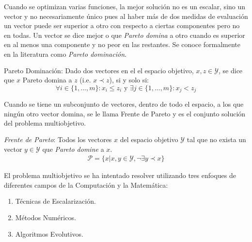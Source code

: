 Cuando se optimizan varias funciones, la mejor soluci\'on  no es un escalar, sino un vector y no necesariamente \'unico pues al haber m\'as de dos medidas de evaluaci\'on un vector puede ser superior a otro con respecto a ciertas componentes pero no en todas. Un vector se dice mejor o que \textit{Pareto domina} a otro cuando es superior en al menos una componente y no peor en las restantes. Se conoce formalmente en la literatura como \textit{Pareto dominaci\'on}.
\begin{definition}{Pareto Dominaci\'on:}
    \label{background:def:domintation}
    Dado dos vectores en el el espacio objetivo, $x, z \in \mathcal{Y}$, se dice que $x$ Pareto domina a $z$ (i.e. $x \prec z$), si y solo si:
    \begin{equation*}
        \forall i \in \{1, ..., m\}: x_i \leq z_i \text{ y } \exists j \in \{1, ..., m\}: x_j < z_j
    \end{equation*}
\end{definition}

Cuando se tiene un subconjunto de vectores, dentro de todo el espacio,  a los que ning\'un otro vector domina, se le  llama Frente de Pareto y es el conjunto soluci\'on del problema multiobjetivo.

\begin{definition}
    \label{background:def:pareto_front}
    \textit{Frente de Pareto}: Todos los vectores $x$ del espacio objetivo $\mathcal{Y}$ tal que no exista un vector $y \in \mathcal{Y}$ que \textit{Pareto domine} a $x$.
    \begin{align*}
        \mathcal{P} = \{x| x, y \in \mathcal{Y}, \neg \exists y \prec x \} 
    \end{align*}
\end{definition}



El problema multiobjetivo se ha intentado resolver utilizando tres enfoques de diferentes campos de la Computaci\'on y la Matem\'atica:
\begin{enumerate}
    \item T\'ecnicas de Escalarizaci\'on.
    \item M\'etodos Num\'ericos.
    \item Algoritmos Evolutivos.
\end{enumerate}



